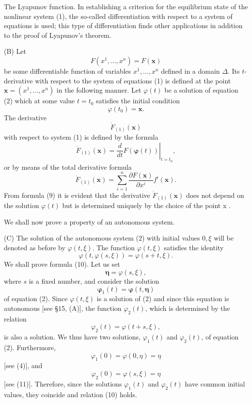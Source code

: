 \documentclass[10pt,a5paper]{book}
\theoremstyle{plain}
\theoremstyle{definition}
\theoremstyle{remark}
\begin{document}
The Lyapunov function. In establishing a criterion for the equilibrium state of the nonlinear system (1), the so-called differentiation with respect to a system of equations is used; this type of differentiation finds other applications in addition to the proof of Lyapunov's theorem.

(B) Let
\[
F\left(x^{1}, \ldots, x^{n}\right)=F(\mathbf{x})
\]
be some differentiable function of variables $x^{1}, \ldots, x^{n}$ defined in a domain $\Delta$. Its $t$-derivative with respect to the system of equations (1) is defined at the point $\mathbf{x}=\left(x^{1}, \ldots, x^{n}\right)$ in the following manner. Let $\varphi(t)$ be a solution of equation (2) which at some value $t=t_{0}$ satisfies the initial condition
\[
\varphi\left(t_{0}\right)=\mathbf{x} .
\]
The derivative
\[
\dot{F}_{(1)}(\mathbf{x})
\]
with respect to system (1) is defined by the formula
\[
\dot{F}_{(1)}(\mathbf{x})=\left.\frac{d}{d t} F(\boldsymbol{\varphi}(t))\right|_{t=t_{0}},
\]
or by means of the total derivative formula
\begin{equation*}
\dot{F}_{(1)}(\mathbf{x})=\sum_{i=1}^{n} \frac{\partial F(\mathbf{x})}{\partial x^{i}} f^{i}(\mathbf{x}) . \tag{9}
\end{equation*}
From formula (9) it is evident that the derivative $\dot{F}_{(1)}(\mathbf{x})$ does not depend on the solution $\varphi(t)$ but is determined uniquely by the choice of the point x .

We shall now prove a property of an autonomous system.

(C) The solution of the autonomous system (2) with initial values $0, \xi$ will be denoted as before by $\varphi(t, \xi)$. The function $\varphi(t, \xi)$ satisfies the identity
\begin{equation*}
\varphi(t, \varphi(s, \xi))=\varphi(s+t, \xi) . \tag{10}
\end{equation*}
We shall prove formula (10). Let us set
\begin{equation*}
\boldsymbol{\eta}=\varphi(s, \xi), \tag{11}
\end{equation*}
where $s$ is a fixed number, and consider the solution
\[
\boldsymbol{\varphi}_{1}(t)=\boldsymbol{\varphi}(t, \boldsymbol{\eta})
\]
of equation (2). Since $\varphi(t, \xi)$ is a solution of (2) and since this equation is autonomous [see §15, (A)], the function $\varphi_{2}(t)$, which is determined by the relation
\[
\varphi_{2}(t)=\varphi(t+s, \xi),
\]
is also a solution. We thus have two solutions, $\varphi_{1}(t)$ and $\varphi_{2}(t)$, of equation (2). Furthermore,
\[
\varphi_{1}(0)=\varphi(0, \eta)=\eta
\]
[see (4)], and
\[
\varphi_{2}(0)=\varphi(s, \xi)=\eta
\]
[see (11)]. Therefore, since the solutions $\varphi_{1}(t)$ and $\varphi_{2}(t)$ have common initial values, they coincide and relation (10) holds.
\end{document}
